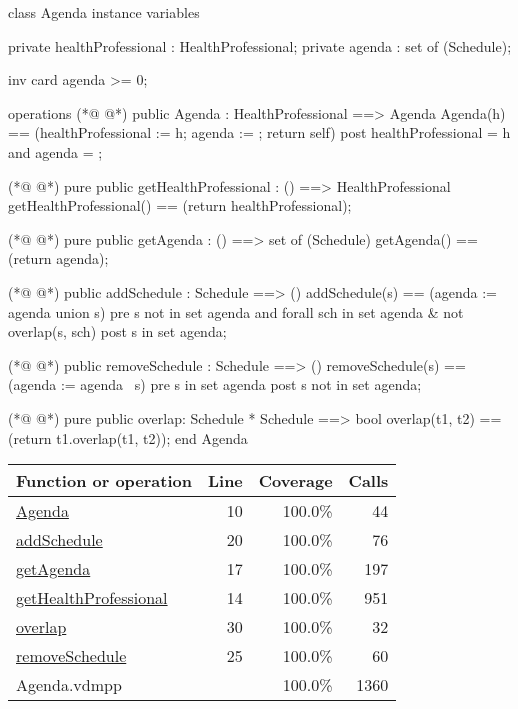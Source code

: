 \begin{vdmpp}[breaklines=true]
class Agenda
instance variables

private healthProfessional : HealthProfessional;
private agenda : set of (Schedule);

inv card agenda >= 0;

operations
(*@
\label{Agenda:10}
@*)
 public Agenda : HealthProfessional ==> Agenda
  Agenda(h) == (healthProfessional := h; agenda := {}; return self)
 post healthProfessional = h and agenda = {};
 
(*@
\label{getHealthProfessional:14}
@*)
 pure public getHealthProfessional : () ==> HealthProfessional
  getHealthProfessional() == (return healthProfessional);
 
(*@
\label{getAgenda:17}
@*)
 pure public getAgenda : () ==> set of (Schedule)
  getAgenda() == (return agenda);
 
(*@
\label{addSchedule:20}
@*)
 public addSchedule : Schedule ==> ()
  addSchedule(s) == (agenda := agenda union {s})
 pre s not in set agenda and forall sch in set agenda & not overlap(s, sch)
 post s in set agenda;
 
(*@
\label{removeSchedule:25}
@*)
 public removeSchedule : Schedule ==> ()
  removeSchedule(s) == (agenda := agenda \ {s})
 pre s in set agenda
 post s not in set agenda;
 
(*@
\label{overlap:30}
@*)
 pure public overlap: Schedule * Schedule ==> bool
  overlap(t1, t2) == (return t1.overlap(t1, t2));
end Agenda
\end{vdmpp}
\bigskip
\begin{longtable}{|l|r|r|r|}
\hline
Function or operation & Line & Coverage & Calls \\
\hline
\hline
\hyperref[Agenda:10]{Agenda} & 10&100.0\% & 44 \\
\hline
\hyperref[addSchedule:20]{addSchedule} & 20&100.0\% & 76 \\
\hline
\hyperref[getAgenda:17]{getAgenda} & 17&100.0\% & 197 \\
\hline
\hyperref[getHealthProfessional:14]{getHealthProfessional} & 14&100.0\% & 951 \\
\hline
\hyperref[overlap:30]{overlap} & 30&100.0\% & 32 \\
\hline
\hyperref[removeSchedule:25]{removeSchedule} & 25&100.0\% & 60 \\
\hline
\hline
Agenda.vdmpp & & 100.0\% & 1360 \\
\hline
\end{longtable}

